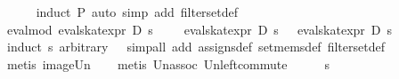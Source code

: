 \begin{isabellebody}
\ \ \ \ \isamarkupfalse%
\ {}induct\ P{}\ auto\ simp\ add{}\ filter{}set{}def{}\isanewline
{}\isamarkupfalse%
%
\endisatagproof
{\isafoldproof}%
%
\isadelimproof
\isanewline
%
\endisadelimproof
\isanewline
{}\isamarkupfalse%
\ eval{}mod{}{}\ {}eval{}skat{}expr\ D\ s\ {}{}\ {}\ {}{}\ {}\ eval{}skat{}expr\ D\ s\ {}\ {}\ eval{}skat{}expr\ D\ s\ {}{}\isanewline
%
\isadelimproof
\ \ %
\endisadelimproof
%
\isatagproof
{}\isamarkupfalse%
\ {}induct\ s\ arbitrary{}\ {}\ {}{}\ simp{}all\ add{}\ assigns{}def\ set{}mems{}def\ filter{}set{}def{}\isanewline
\ \ \isamarkupfalse%
\ {}metis\ image{}Un{}\isanewline
\ \ \isamarkupfalse%
\ {}metis\ Un{}assoc\ Un{}left{}commute{}\isanewline
{}\isamarkupfalse%
\ {}\isanewline
\ \ \isamarkupfalse%
\ s\ {}\ {}\isanewline

\end{isabellebody}
